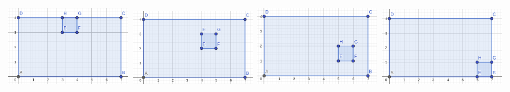 \documentclass{article}
\begin{document}
\includegraphics[width=120px]{sample-2-1}
\includegraphics[width=120px]{sample-2-2}
\includegraphics[width=120px]{sample-2-3}
\includegraphics[width=120px]{sample-2-4}

\pagebreak
\end{document}

